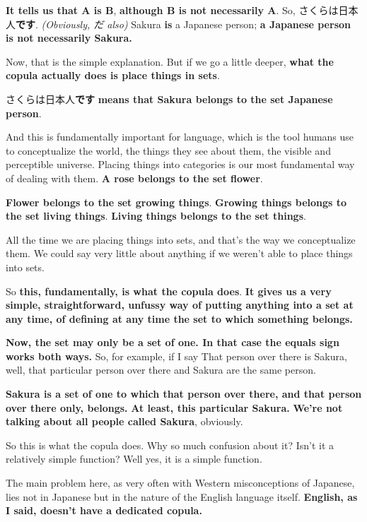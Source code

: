 {\bf It tells us that A is B}, {\bf although B is not necessarily A}. So, さくらは日本人{\bf です}. {\em (Obviously, だ also)} Sakura {\bf is} a Japanese person; {\bf a Japanese person is not necessarily Sakura.}

Now, that is the simple explanation. But if we go a little deeper, {\bf what the copula actually does is place things in sets}.

さくらは日本人{\bf です} {\bf means that Sakura belongs to the set Japanese person}.

{}

And this is fundamentally important for language, which is the tool humans use to conceptualize the world, the things they see about them, the visible and perceptible universe. Placing things into categories is our most fundamental way of dealing with them. {\bf A rose belongs to the set flower}.

{\bf Flower belongs to the set growing things}. {\bf Growing things belongs to the set living things}. {\bf Living things belongs to the set things}.

All the time we are placing things into sets, and that's the way we conceptualize them. We could say very little about anything if we weren't able to place things into sets.

So {\bf this, fundamentally, is what the copula does}. {\bf It gives us a very simple, straightforward, unfussy way of putting anything into a set at any time, of defining at any time the set to which something belongs.}

\thinrule

{\bf Now, the set may only be a set of one. In that case the equals sign works both ways.} So, for example, if I say That person over there is Sakura, well, that particular person over there and Sakura are the same person.

{\bf Sakura is a set of one to which that person over there, and that person over there only, belongs.} {\bf At least, this particular Sakura.} {\bf We're not talking about all people called Sakura}, obviously.

So this is what the copula does. Why so much confusion about it? Isn't it a relatively simple function? Well yes, it is a simple function.

The main problem here, as very often with Western misconceptions of Japanese, lies not in Japanese but in the nature of the English language itself. {\bf English, as I said, doesn't have a dedicated copula.}

